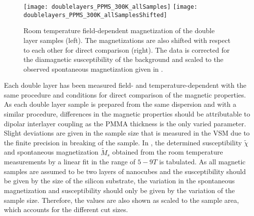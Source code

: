 \documentclass[\main/dresen_thesis.tex]{subfiles}
\begin{document}
  \label{sec:doubleLayers:vsm}

  \begin{figure}[tb]
    \centering
    \texttt{[image: doublelayers\_PPMS\_300K\_allSamples]}
    \texttt{[image: doublelayers\_PPMS\_300K\_allSamplesShifted]}
    \caption{\label{fig:doubleLayers:RTVSM}Room temperature field-dependent magnetization of the double layer samples (left). The magnetizations are also shifted with respect to each other for direct comparison (right). The data is corrected for the diamagnetic susceptibility of the background and scaled to the observed spontaneous magnetization given in .}
  \end{figure}

    Each double layer has been measured field- and temperature-dependent with the same procedure and conditions for direct comparison of the magnetic properties.
    As each double layer sample is prepared from the same dispersion and with a similar procedure, differences in the magnetic properties should be attributable to dipolar interlayer coupling as the PMMA thickness is the only varied parameter.
    Slight deviations are given in the sample size that is measured in the VSM due to the finite precision in breaking of the sample.
    In , the determined susceptibility $\tilde{\chi}$ and spontaneous magnetization $\tilde{M}_s$ obtained from the room temperature measurements by a linear fit in the range of $5 - 9 \unit{T}$ is tabulated.
    As all  magnetic samples are assumed to be two layers of nanocubes and the susceptibility should be given by the size of the silicon substrate, the variation in the spontaneous magnetization and susceptibility should only be given by the variation of the sample size.
    Therefore, the values are also shown as scaled to the sample area, which accounts for the different cut sizes.
\end{document}
